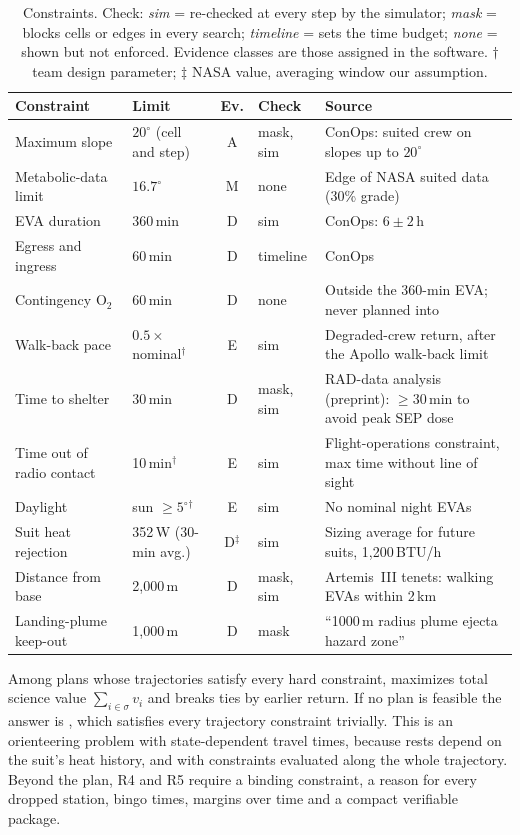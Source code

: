 \begin{table}[t]
  \centering\small
  \caption{Constraints. Check: \emph{sim} = re-checked at every step by the simulator; \emph{mask} = blocks cells or edges in every search; \emph{timeline} = sets the time budget; \emph{none} = shown but not enforced. Evidence classes are those assigned in the software. $\dagger$ team design parameter; $\ddagger$ NASA value, averaging window our assumption.}
  \label{tab:rules}
  \begin{tabularx}{\textwidth}{@{}l l c l L@{}}
    \toprule
    Constraint & Limit & Ev. & Check & Source \\
    \midrule
    Maximum slope & $20^\circ$ (cell and step) & A & mask, sim & ConOps: suited crew on slopes up to $20^\circ$ \citep{coan2020conops} \\
    Metabolic-data limit & $16.7^\circ$ & M & none & Edge of NASA suited data (30\% grade) \citep{norcross2010incline} \\
    EVA duration & 360\,min & D & sim & ConOps: $6\pm2$\,h \citep{coan2020conops} \\
    Egress and ingress & 60\,min & D & timeline & ConOps \citep{coan2020conops} \\
    Contingency O$_2$ & 60\,min & D & none & Outside the 360-min EVA; never planned into \citep{coan2020conops} \\
    Walk-back pace & $0.5\times$ nominal$^\dagger$ & E & sim & Degraded-crew return, after the Apollo walk-back limit \citep{benjamin1969apollo} \\
    Time to shelter & 30\,min & D & mask, sim & RAD-data analysis (preprint): ${\ge}30$\,min to avoid peak SEP dose \citep{lowe2025nowcast} \\
    Time out of radio contact & 10\,min$^\dagger$ & E & sim & Flight-operations constraint, max time without line of sight \citep{caswell2025eva} \\
    Daylight & sun $\ge5^\circ$$^\dagger$ & E & sim & No nominal night EVAs \citep{drake2009dra5add} \\
    Suit heat rejection & 352\,W (30-min avg.) & D$^\ddagger$ & sim & Sizing average for future suits, 1,200\,BTU/h \citep{ogilvie2026marsmass} \\
    Distance from base & 2,000\,m & D & mask, sim & Artemis~III tenets: walking EVAs within 2\,km \citep{kagey2023tenets} \\
    Landing-plume keep-out & 1,000\,m & D & mask & ``1000\,m radius plume ejecta hazard zone'' \citep{bussey2016landing} \\
    \bottomrule
  \end{tabularx}
\end{table}

Among plans whose trajectories satisfy every hard constraint, \Marswalk maximizes total science value $\sum_{i\in\sigma}v_i$ and breaks ties by earlier return. If no plan is feasible the answer is \stayin, which satisfies every trajectory constraint trivially. This is an orienteering problem with state-dependent travel times, because rests depend on the suit's heat history, and with constraints evaluated along the whole trajectory. Beyond the plan, R4 and R5 require a binding constraint, a reason for every dropped station, bingo times, margins over time and a compact verifiable package.
